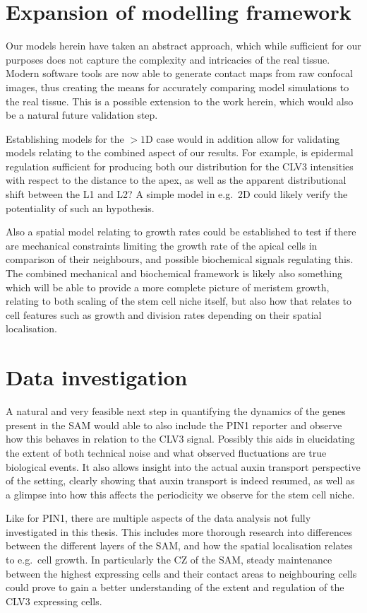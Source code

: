 \section{Expansion of modelling framework}
Our models herein have taken an abstract approach, which while sufficient for
our purposes does not capture the complexity and intricacies of the real tissue.
Modern software tools are now able to generate contact maps from raw confocal
images, thus creating the means for accurately comparing model simulations to
the real tissue. This is a possible extension to the work herein, which would
also be a natural future validation step. 

Establishing models for the $>1$D case would in addition allow for validating
models relating to the combined aspect of our results. For example, is epidermal
regulation sufficient for producing both our distribution for the CLV3
intensities with respect to the distance to the apex, as well as the apparent
distributional shift between the L1 and L2? A simple model in e.g.\ 2D could
likely verify the potentiality of such an hypothesis.

Also a spatial model relating to growth rates could be established to test if
there are mechanical constraints limiting the growth rate of the apical cells in
comparison of their neighbours, and possible biochemical signals regulating
this. The combined mechanical and biochemical framework is likely also something
which will be able to provide a more complete picture of meristem growth,
relating to both scaling of the stem cell niche itself, but also how that
relates to cell features such as growth and division rates depending on their
spatial localisation.

\section{Data investigation}
A natural and very feasible next step in quantifying the dynamics of the genes
present in the SAM would able to also include the PIN1 reporter and observe how
this behaves in relation to the CLV3 signal. Possibly this aids in elucidating
the extent of both technical noise and what observed fluctuations are true
biological events. It also allows insight into the actual auxin transport
perspective of the setting, clearly showing that auxin transport is indeed
resumed, as well as a glimpse into how this affects the periodicity we observe
for the stem cell niche. 

Like for PIN1, there are multiple aspects of the data analysis not fully
investigated in this thesis. This includes more thorough research into
differences between the different layers of the SAM, and how the spatial
localisation relates to e.g.\ cell growth. In particularly the CZ of the SAM,
steady maintenance between the highest expressing cells and their contact areas
to neighbouring cells could prove to gain a better understanding of
the extent and regulation of the CLV3 expressing cells. 

